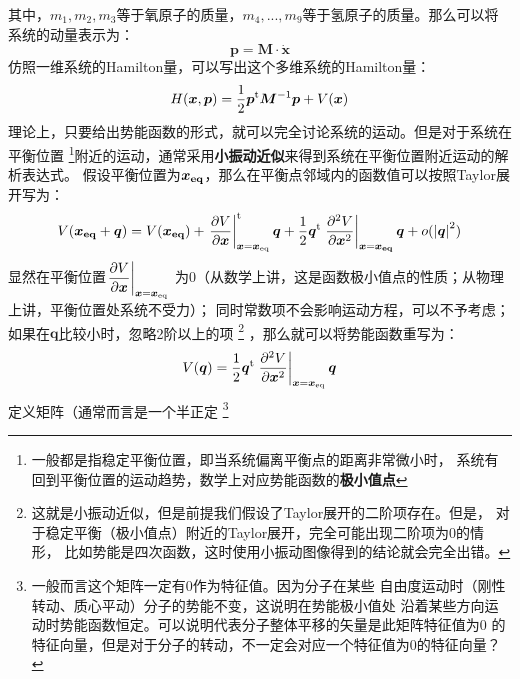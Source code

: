     其中，$m_1,m_2,m_3$等于氧原子的质量，$m_4,...,m_9$等于氢原子的质量。那么可以将
    系统的动量表示为：
    \begin{equation}
        \bm{p} = \bm{M}\cdot\dot{\bm{x}}
    \end{equation}
    仿照一维系统的Hamilton量，可以写出这个多维系统的Hamilton量：
    \begin{equation}
        H(\bm{x}, \bm{p}) = \frac{1}{2}\bm{p}^{\mathrm{t}}\bm{M}^{-1}\bm{p} + V(\bm{x})
    \end{equation}
    理论上，只要给出势能函数的形式，就可以完全讨论系统的运动。但是对于系统在平衡位置
    \footnote{一般都是指稳定平衡位置，即当系统偏离平衡点的距离非常微小时，
    系统有回到平衡位置的运动趋势，数学上对应势能函数的\textbf{极小值点}
    }附近的运动，通常采用\textbf{小振动近似}来得到系统在平衡位置附近运动的解析表达式。
    假设平衡位置为$\bm{x_{\mathrm{eq}}}$，那么在平衡点邻域内的函数值可以按照Taylor展开写为：
    \begin{equation}
        \begin{split}
        V(\bm{x_{\mathrm{eq}}} + \bm{q}) &= V(\bm{x_{\mathrm{eq}}}) + \left.\frac{\partial{V}}{\partial{\bm{x}}}\right|_{\bm{x} = \bm{x}_{\mathrm{eq}}}^{\mathrm{t}}\bm{q}
         + \frac{1}{2}\bm{q}^{\mathrm{t}}\left.\frac{\partial{^2V}}{\partial{\bm{x}^2}}\right|_{\bm{x} = \bm{x_{\mathrm{eq}}}}\bm{q} + o(\left|\bm{q}\right|^2)\\
        \end{split}
    \end{equation}
    显然在平衡位置$\displaystyle\left.\frac{\partial{V}}{\partial{\bm{x}}}\right|_{\bm{x} = \bm{x}_{\mathrm{eq}}}$
    为0（从数学上讲，这是函数极小值点的性质；从物理上讲，平衡位置处系统不受力）；
    同时常数项不会影响运动方程，可以不予考虑；如果在$\bm{q}$比较小时，忽略2阶以上的项
    \footnote{这就是小振动近似，但是前提我们假设了Taylor展开的二阶项存在。但是，
    对于稳定平衡（极小值点）附近的Taylor展开，完全可能出现二阶项为0的情形，
    比如势能是四次函数，这时使用小振动图像得到的结论就会完全出错。
    }
    ，那么就可以将势能函数重写为：
    \begin{equation}
        V(\bm{q}) = \frac{1}{2}\bm{q}^{\mathrm{t}}\left.\frac{\partial{^2V}}{\partial{\bm{x}^2}}\right|_{\bm{x} = \bm{x}_{\mathrm{eq}}}\bm{q}
        \label{potential at equilibrium point}
    \end{equation}
    定义矩阵（通常而言是一个半正定
    \footnote{
        一般而言这个矩阵一定有0作为特征值。因为分子在某些
        自由度运动时（刚性转动、质心平动）分子的势能不变，这说明在势能极小值处
        沿着某些方向运动时势能函数恒定。可以说明代表分子整体平移的矢量是此矩阵特征值为0
        的特征向量，但是对于分子的转动，不一定会对应一个特征值为0的特征向量？
    }
